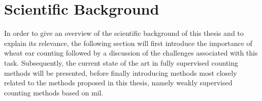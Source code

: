 \documentclass[12pt,parskip = half, DIV=classic,listof=totoc]{scrartcl}
\begin{document}

	 
	\section{Scientific Background}
		In order to give an overview of the scientific background of this thesis and to explain its relevance,
		the following section will first introduce the importance of wheat ear counting followed by a discussion of the 
		challenges associated with this task. Subsequently, the current state of the art in fully supervised counting methods 
		will be presented, before finally introducing methods most closely related to the methods proposed in this thesis,
		namely weakly supervised counting methods based on \ac{mil}. 
\end{document}
